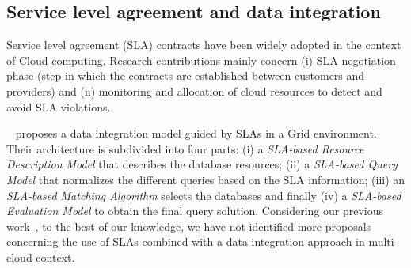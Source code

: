\subsection{Service level agreement and data integration}

Service level agreement (SLA) contracts have been widely adopted in the context of Cloud computing. Research contributions mainly concern (i) SLA negotiation phase (step in which the
contracts are established between customers and providers) and (ii)
monitoring and allocation of cloud resources to detect and avoid SLA
violations.

 ~\cite{Nie07} proposes a data integration model guided by SLAs in a Grid environment.
Their architecture is subdivided into four parts: (i) a \textit{SLA-based
Resource Description Model} that describes the database resources; (ii)
a \textit{SLA-based Query Model} that normalizes the different queries based on the
SLA information; (iii) an \textit{SLA-based Matching Algorithm}  
selects the databases and finally (iv) a \textit{SLA-based Evaluation Model}
 to obtain the final query solution.
Considering our previous work~\cite{012}, to the best of our knowledge, we have
not identified more proposals concerning the use of SLAs combined with a data
integration approach in multi-cloud context.
